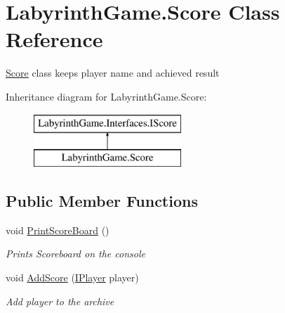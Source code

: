 \hypertarget{class_labyrinth_game_1_1_score}{\section{Labyrinth\+Game.\+Score Class Reference}
\label{class_labyrinth_game_1_1_score}
}


\hyperlink{class_labyrinth_game_1_1_score}{Score} class keeps player name and achieved result  


Inheritance diagram for Labyrinth\+Game.\+Score\+:\begin{figure}[H]
\begin{center}
\leavevmode
\includegraphics[height=2.000000cm]{class_labyrinth_game_1_1_score}
\end{center}
\end{figure}
\subsection*{Public Member Functions}
\begin{DoxyCompactItemize}
\item 
void \hyperlink{class_labyrinth_game_1_1_score_a7f8fff906c41948227a16058b09214a7}{Print\+Score\+Board} ()
\begin{DoxyCompactList}\small\item\em Prints Scoreboard on the console \end{DoxyCompactList}\item 
void \hyperlink{class_labyrinth_game_1_1_score_a264649a0a5a33dee022dc1a94ab85c9f}{Add\+Score} (\hyperlink{interface_labyrinth_game_1_1_interfaces_1_1_i_player}{I\+Player} player)
\begin{DoxyCompactList}\small\item\em Add player to the archive \end{DoxyCompactList}\end{DoxyCompactItemize}
